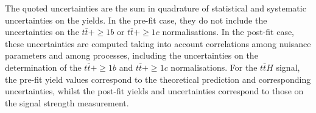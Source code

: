 \begin{table}[htbp]
{  The quoted uncertainties are the sum in quadrature of statistical and systematic uncertainties on the yields. In the pre-fit case, they do not include the uncertainties on the $t\bar{t} + \ge1b$ or $t\bar{t} + \ge1c$ normalisations. In the post-fit case, these uncertainties are computed taking into account correlations among nuisance parameters and among processes, including the uncertainties on the determination of the $t\bar{t} + \ge1b$ and $t\bar{t} + \ge1c$ normalisations.  For the $t\bar{t}H$ signal, the pre-fit yield values correspond to the theoretical prediction and corresponding uncertainties, whilst the post-fit yields and uncertainties correspond to those on the signal strength measurement.
  }
  \label{tab:tth:SLyields}
\end{table}


